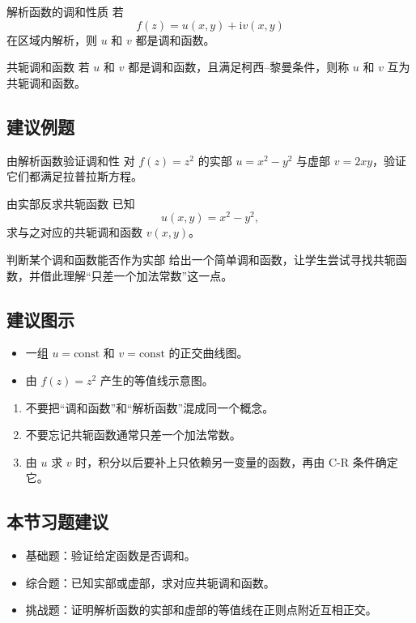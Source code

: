 \begin{dingli}{解析函数的调和性质}{}
若
\[
    f(z)=u(x,y)+\mathrm{i}v(x,y)
\]
在区域内解析，则 $u$ 和 $v$ 都是调和函数。
\end{dingli}

\begin{dingliyi}{共轭调和函数}{}
若 $u$ 和 $v$ 都是调和函数，且满足柯西--黎曼条件，则称 $u$ 和 $v$ 互为共轭调和函数。
\end{dingliyi}

\subsection*{建议例题}
\begin{lizi}{由解析函数验证调和性}{}
对 $f(z)=z^2$ 的实部 $u=x^2-y^2$ 与虚部 $v=2xy$，验证它们都满足拉普拉斯方程。
\end{lizi}

\begin{lizi}{由实部反求共轭函数}{}
已知
\[
    u(x,y)=x^2-y^2,
\]
求与之对应的共轭调和函数 $v(x,y)$。
\end{lizi}

\begin{lizi}{判断某个调和函数能否作为实部}{}
给出一个简单调和函数，让学生尝试寻找共轭函数，并借此理解``只差一个加法常数''这一点。
\end{lizi}

\subsection*{建议图示}
\begin{itemize}
    \item 一组 $u=\text{const}$ 和 $v=\text{const}$ 的正交曲线图。
    \item 由 $f(z)=z^2$ 产生的等值线示意图。
\end{itemize}

\begin{jinshi}[本节易错点]
\begin{enumerate}
    \item 不要把``调和函数''和``解析函数''混成同一个概念。
    \item 不要忘记共轭函数通常只差一个加法常数。
    \item 由 $u$ 求 $v$ 时，积分以后要补上只依赖另一变量的函数，再由 C-R 条件确定它。
\end{enumerate}
\end{jinshi}

\subsection*{本节习题建议}
\begin{itemize}
    \item 基础题：验证给定函数是否调和。
    \item 综合题：已知实部或虚部，求对应共轭调和函数。
    \item 挑战题：证明解析函数的实部和虚部的等值线在正则点附近互相正交。
\end{itemize}


